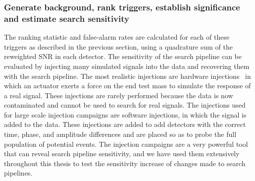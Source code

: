 \subsubsection{Generate background, rank triggers, establish significance and estimate search sensitivity}

The ranking statistic and false-alarm rates are calculated for each of these triggers as described in the previous section, using a quadrature sum of the reweighted SNR in each detector. The sensitivity of the search pipeline can be evaluated by injecting many simulated \gwadj signals into the data and recovering them with the search pipeline. The most realistic injections are hardware injections~\cite{Brown:2003, Biwer:2016} in which an actuator exerts a force on the end test mass to simulate the response of a real \gwadj signal. These injections are rarely performed because the data is now contaminated and cannot be used to search for real \gwadj signals. The injections used for large scale injection campaigns are software injections, in which the \gwadj signal is added to the data. These injections are added to add detectors with the correct time, phase, and amplitude differences and are placed so as to probe the full population of potential \gwadj events. The injection campaigns are a very powerful tool that can reveal search pipeline sensitivity, and we have used them extensively throughout this thesis to test the sensitivity increase of changes made to search pipelines.
